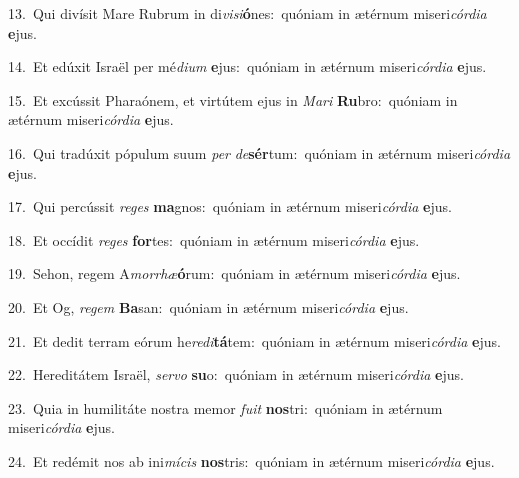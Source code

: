 {\numbfont\textcolor{\numbcolor}{13.}}~Qui divísit Mare Rubrum in di\-\textit{vi}\-\textit{si}\textbf{ó}nes:~\star quóniam in ætérnum miseri\-\textit{cór}\-\textit{di}\textit{a} \textbf{e}\-jus.\par
{\numbfont\textcolor{\numbcolor}{14.}}~Et edúxit Israël per mé\-\textit{di}\-\textit{um} \textbf{e}\-jus:~\star quóniam in ætérnum miseri\-\textit{cór}\-\textit{di}\textit{a} \textbf{e}\-jus.\par
{\numbfont\textcolor{\numbcolor}{15.}}~Et excússit Pharaónem, et virtútem ejus in \textit{Ma}\-\textit{ri} \textbf{Ru}\-bro:~\star quóniam in ætérnum miseri\-\textit{cór}\-\textit{di}\textit{a} \textbf{e}\-jus.\par
{\numbfont\textcolor{\numbcolor}{16.}}~Qui tradúxit pópulum suum \textit{per} \textit{de}\-\textbf{sér}tum:~\star quóniam in ætérnum miseri\-\textit{cór}\-\textit{di}\textit{a} \textbf{e}\-jus.\par
{\numbfont\textcolor{\numbcolor}{17.}}~Qui percússit \textit{re}\-\textit{ges} \textbf{ma}\-gnos:~\star quóniam in ætérnum miseri\-\textit{cór}\-\textit{di}\textit{a} \textbf{e}\-jus.\par
{\numbfont\textcolor{\numbcolor}{18.}}~Et occídit \textit{re}\-\textit{ges} \textbf{for}\-tes:~\star quóniam in ætérnum miseri\-\textit{cór}\-\textit{di}\textit{a} \textbf{e}\-jus.\par
{\numbfont\textcolor{\numbcolor}{19.}}~Sehon, regem A\-\textit{mor}\-\textit{rhæ}\textbf{ó}rum:~\star quóniam in ætérnum miseri\-\textit{cór}\-\textit{di}\textit{a} \textbf{e}\-jus.\par
{\numbfont\textcolor{\numbcolor}{20.}}~Et Og, \textit{re}\-\textit{gem} \textbf{Ba}\-san:~\star quóniam in ætérnum miseri\-\textit{cór}\-\textit{di}\textit{a} \textbf{e}\-jus.\par
{\numbfont\textcolor{\numbcolor}{21.}}~Et dedit terram eórum he\-\textit{re}\-\textit{di}\textbf{tá}tem:~\star quóniam in ætérnum miseri\-\textit{cór}\-\textit{di}\textit{a} \textbf{e}\-jus.\par
{\numbfont\textcolor{\numbcolor}{22.}}~Hereditátem Israël, \textit{ser}\-\textit{vo} \textbf{su}\-o:~\star quóniam in ætérnum miseri\-\textit{cór}\-\textit{di}\textit{a} \textbf{e}\-jus.\par
{\numbfont\textcolor{\numbcolor}{23.}}~Quia in humilitáte nostra memor \textit{fu}\-\textit{it} \textbf{nos}\-tri:~\star quóniam in ætérnum miseri\-\textit{cór}\-\textit{di}\textit{a} \textbf{e}\-jus.\par
{\numbfont\textcolor{\numbcolor}{24.}}~Et redémit nos ab ini\-\textit{mí}\-\textit{cis} \textbf{nos}\-tris:~\star quóniam in ætérnum miseri\-\textit{cór}\-\textit{di}\textit{a} \textbf{e}\-jus.\par
